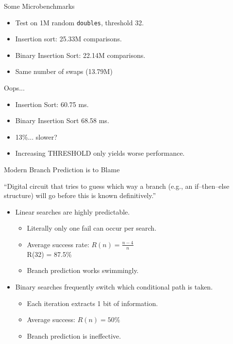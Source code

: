 \documentclass[13pt]{beamer}
\begin{document}
\begin{frame}{Some Microbenchmarks}
	\begin{itemize}[<+->]
		\item Test on 1M random \texttt{doubles}, threshold 32.
		\item Insertion sort: 25.33M comparisons.
		\item Binary Insertion Sort: 22.14M comparisons.
		\item Same number of swaps (13.79M)
	\end{itemize}
\end{frame}

\begin{frame}{Oops...}
	\begin{itemize}[<+->]
		\item Insertion Sort: 60.75 ms.
		\item Binary Insertion Sort 68.58 ms.
		\item 13\%... slower?
		\item Increasing THRESHOLD only yields worse performance.
	\end{itemize}
\end{frame}

\begin{frame}{Modern Branch Prediction is to Blame}
	\begin{displayquote}
		``Digital circuit that tries to guess which way a branch (e.g., an
		if–then–else structure) will go before this is known definitively.''
	\end{displayquote}

	\begin{itemize}
		\item\pause Linear searches are highly predictable.
		\begin{itemize}
			\item Literally only one fail can occur per search.
			\item Average success rate: $R(n) = \frac{n - 4}{n}$\\
			      R(32) = 87.5\%
			\item Branch prediction works swimmingly.
		\end{itemize}
		\item\pause Binary searches frequently switch which conditional path is taken.
		\begin{itemize}
			\item Each iteration extracts 1 bit of information.
			\item Average success: $R(n) = 50\%$
			\item Branch prediction is ineffective.
		\end{itemize}
	\end{itemize}
\end{frame}
\end{document}
